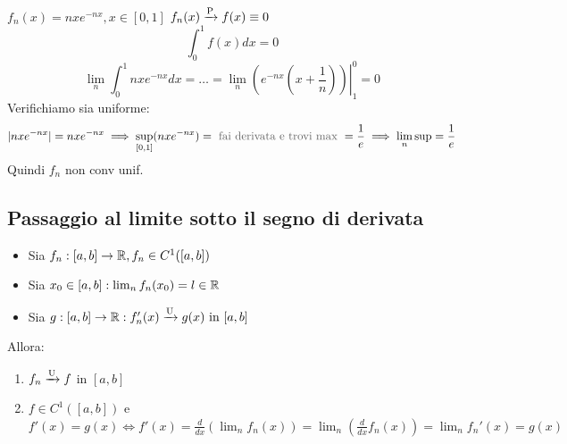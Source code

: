 \begin{example}
    \(f_{n}(x)=nxe^{-nx}, x \in[0,1]\)
    \(f_{n}(x)\xrightarrow{\mathrm{P}}f(x)\equiv 0\)
    \[
    \int_{0}^{1} f(x) dx = 0
    \]
    \[
    \lim_{n} \int_{0}^{1}nx e^{-nx} dx = \dots = \lim_{n} \left. (e^{-nx} (x+\frac{1}{n}))\right|_{1}^0 = 0
    \]
    Verifichiamo sia uniforme:
    \[
    |nx e^{-nx}|= nxe^{-nx} \implies \sup_{[0,1]} (nxe^{-nx}) = \text{\pencilnote{fai derivata e trovi max}} = \frac{1}{e} \implies \lim_{n} \sup = \frac{1}{e}
    \]
    Quindi \(f_{n}\) non conv unif.    
    
\end{example}


\subsection{Passaggio al limite sotto il segno di derivata}
\begin{theorem}
    \begin{itemize}
        \item Sia \(f_{n}:[a,b]\to \mathbb{R}, f_{n} \in C^1 ([a,b])\) 
        \item Sia \(x_{0}\in [a,b]: \lim_{n} f_{n}(x_{0})=l \in \mathbb{R}\) 
        \item Sia \(g:[a,b]\to \mathbb{R} : f_{n}' (x) \xrightarrow{\mathrm{U}} g(x) \text{ in } [a,b]\) 
    \end{itemize}
    Allora:
    \begin{enumerate}
        \item \(f_{n} \xrightarrow{\mathrm{U}} f\) in \([a,b]\)
        \item \(f\in C^1 ([a,b])\) e \(f'(x) = g(x) \iff f'(x) = \frac{d}{dx} (\lim_{n} f_{n}(x)) = \lim_{n}(\frac{d}{dx} f_{n} (x))= \lim_{n}f_{n}'(x) = g(x)\)
    \end{enumerate}
\end{theorem}
